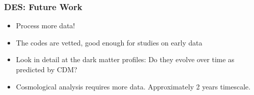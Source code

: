 \documentclass{beamer}
\begin{document}
\frame
{
    \frametitle{DES: Future Work}

 
    \begin{itemize}

        \item Process more data!

        \item The codes are vetted, good enough for studies on early data

        \item Look in detail at the dark matter profiles: Do they evolve over
            time as predicted by CDM?

        \item Cosmological analysis requires more data.  Approximately 2 years
            timescale.

    \end{itemize}

}
\end{document}
